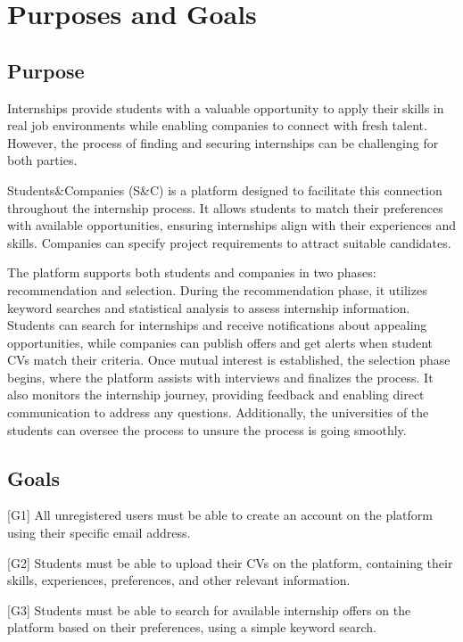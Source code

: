 \renewcommand{\thesection}{\Alph{section}}
\section{Purposes and Goals}\label{sec:purposeandgoals}
\subsection{Purpose}\label{subsec:purpose}
Internships provide students with a valuable opportunity to apply their skills in real job environments while enabling companies to connect with 
fresh talent. However, the process of finding and securing internships can be challenging for both parties.

Students\&Companies (S\&C) is a platform designed to facilitate this connection throughout the internship process. It allows 
students to match their preferences with available opportunities, ensuring internships align with their experiences and skills. 
Companies can specify project requirements to attract suitable candidates.

The platform supports both students and companies in two phases: recommendation and selection. During the recommendation phase, 
it utilizes keyword searches and statistical analysis to assess internship information. Students can search for internships and receive 
notifications about appealing opportunities, while companies can publish offers and get alerts when student CVs match their criteria.
Once mutual interest is established, the selection phase begins, where the platform assists with interviews and finalizes the process. 
It also monitors the internship journey, providing feedback and enabling direct communication to address any questions. Additionally, 
the universities of the students can oversee the process to unsure the process is going smoothly.

\subsection{Goals}\label{subsec:goals}
[G1] All unregistered users must be able to create an account on the platform using their specific email address.

[G2] Students must be able to upload their CVs on the platform, containing their skills, experiences, preferences, and other relevant information.

[G3] Students must be able to search for available internship offers on the platform based on their preferences, using a simple keyword search.

